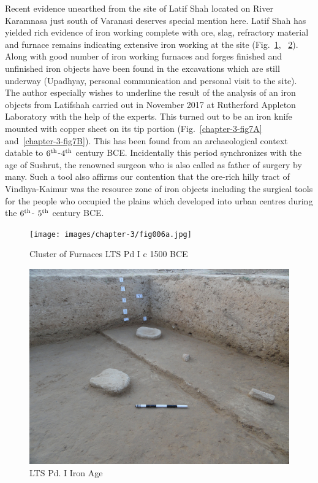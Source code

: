 Recent evidence unearthed from the site of Latif Shah located on River Karamnasa just south of Varanasi deserves special mention here. Latif Shah has yielded rich evidence of iron working complete with ore, slag, refractory material and furnace remains indicating extensive iron working at the site (Fig.~\ref{chapter-3-fig6A}, ~\ref{chapter-3-fig6B}). Along with good number of iron working furnaces and forges finished and unfinished iron objects have been found in the excavations which are still underway (Upadhyay, personal communication and personal visit to the site). The author especially wishes to underline the result of the analysis of an iron objects from Latifshah carried out in November 2017 at Rutherford Appleton Laboratory with the help of the experts. This turned out to be an iron knife mounted with copper sheet on its tip portion (Fig.~\ref{chapter-3-fig7A} and~\ref{chapter-3-fig7B}). This has been found from an archaeological context datable to $6^{\rm th}$-$4^{\rm th}$ century BCE. Incidentally this period synchronizes with the age of Sushrut, the renowned surgeon who is also called as father of surgery by many. Such a tool also affirms our contention that the ore-rich hilly tract of Vindhya-Kaimur was the resource zone of iron objects including the surgical tools for the people who occupied the plains which developed into urban centres during the $6^{\rm th}$- $5^{\rm th}$ century BCE.

\begin{figure}[H]
\renewcommand{\thefigure}{6A}
\texttt{[image: images/chapter-3/fig006a.jpg]}
\caption{Cluster of Furnaces LTS Pd I c 1500 BCE}\label{chapter-3-fig6A}
\end{figure}

\newpage

\begin{figure}[H]
\renewcommand{\thefigure}{6B}
\includegraphics[scale=1.5]{images/chapter-3/fig006b.jpg}
\caption{LTS Pd. I Iron Age}\label{chapter-3-fig6B}
\end{figure}

